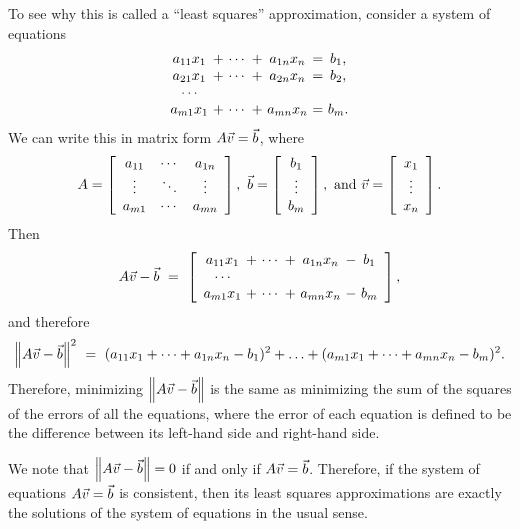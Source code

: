 \documentclass{ximera}
\begin{document}
To see why this is called a ``least squares'' approximation, consider
a system of equations
\begin{equation*}
  \begin{array}{c@{~}c@{~}c@{~}c@{~}c@{~}c@{~}c}
    a_{11}x_1 &+& \cdots &+& a_{1n}x_n &=& b_1, \\
    a_{21}x_1 &+& \cdots &+& a_{2n}x_n &=& b_2, \\
    \cdots  \\
    a_{m1}x_1 &+& \cdots &+& a_{mn}x_n &=& b_m. \\
  \end{array}
\end{equation*}
We can write this in matrix form $A\vect{v}=\vect{b}$, where
\begin{equation*}
  A = \startmat{ccc}
    a_{11} & \cdots & a_{1n} \\
    \vdots & \ddots & \vdots \\
    a_{m1} & \cdots & a_{mn} \\
  \stopmat,
  \quad
  \vect{b} = \startmat{c} b_1 \\ \vdots \\ b_m \stopmat,
  \quad\mbox{and}\quad
  \vect{v} = \startmat{c} x_1 \\ \vdots \\ x_n \stopmat.
\end{equation*}
Then
\begin{equation*}
  A\vect{v} - \vect{b} ~=~
  \startmat{c@{~}c@{~}c@{~}c@{~}c@{~}c@{~}c}
    a_{11}x_1 &+& \cdots &+& a_{1n}x_n &-& b_1 \\
    \cdots \\
    a_{m1}x_1 &+& \cdots &+& a_{mn}x_n &-& b_m \\
  \stopmat,
\end{equation*}
and therefore
\begin{equation*}
  \norm{A\vect{v} - \vect{b}}^2 ~=~
  (a_{11}x_1 + \cdots + a_{1n}x_n - b_1)^2 + \ldots
  + (a_{m1}x_1 + \cdots + a_{mn}x_n - b_m)^2.
\end{equation*}
Therefore, minimizing $\norm{A\vect{v}-\vect{b}}$ is the same as
minimizing the sum of the squares of the errors of all the equations,
where the error of each equation is defined to be the difference
between its left-hand side and right-hand side.

We note that $\norm{A\vect{v}-\vect{b}}=0$ if and only if
$A\vect{v}=\vect{b}$. Therefore, if the system of equations
$A\vect{v}=\vect{b}$ is consistent, then its least squares
approximations are exactly the solutions of the system of equations in
the usual sense.
\end{document}
